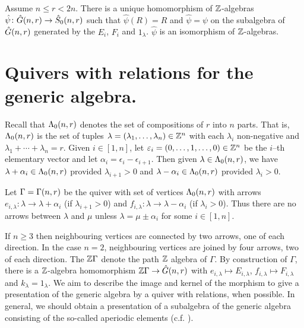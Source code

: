 \documentclass[a4paper, 11pt]{report}
\begin{document}
\begin{theorem}
Assume $n\le r< 2n$. There is a unique homomorphism of $\mathbb{Z}$-algebras $\hat{\psi}\colon\hat{G}(n,r)\to\hat{S}_0(n,r)$ such that $\hat{\psi}(R)=R$ and $\hat{\psi}=\psi$ on the subalgebra of $\hat{G}(n,r)$ generated by the $E_i$, $F_i$ and $1_\lambda$. $\hat{\psi}$ is an isomorphism of $\mathbb{Z}$-algebras.
\end{theorem}

\section{Quivers with relations for the generic algebra.}

Recall that $\Lambda_0(n,r)$ denotes the set of compositions of $r$ into $n$ parts. That is, $\Lambda_0(n,r)$ is the set of tuples $\lambda = (\lambda_1,\ldots,\lambda_n)\in\mathbb{Z}^n$ with each $\lambda_i$ non-negative and $\lambda_1 +\cdots +\lambda_n = r$. Given $i\in [1,n]$, let $\varepsilon_i = (0,\ldots,1,\ldots,0)\in\mathbb{Z}^n$ be the $i$--th elementary vector and let $\alpha_i = \epsilon_i - \epsilon_{i+1}$. Then given $\lambda\in\Lambda_0(n,r)$, we have $\lambda + \alpha_i\in\Lambda_0(n,r)$ provided $\lambda_{i+1}>0$ and $\lambda - \alpha_i\in\Lambda_0(n,r)$ provided $\lambda_i>0$.

Let $\Gamma =\Gamma(n,r)$ be the quiver with set of vertices $\Lambda_0(n,r)$ with arrows $e_{i,\lambda}\colon\lambda\to\lambda +\alpha_i$ (if $\lambda_{i+1}>0$) and $f_{i,\lambda}\colon\lambda\to\lambda -\alpha_i$ (if $\lambda_i>0$). Thus there are no arrows between $\lambda$ and $\mu$ unless $\lambda = \mu\pm \alpha_i$ for some $i\in [1,n]$.

If $n\geq 3$ then neighbouring vertices are connected by two arrows, one of each direction. In the case $n=2$, neighbouring vertices are joined by four arrows, two of each direction. The $\mathbb{Z}\Gamma$ denote the path $\mathbb{Z}$ algebra of $\Gamma$. By construction of $\Gamma$, there is a $\mathbb{Z}$-algebra homomorphism $\mathbb{Z}\Gamma\to\hat{G}(n,r)$ with $e_{i,\lambda}\mapsto E_{i,\lambda}$, $f_{i,\lambda}\mapsto F_{i,\lambda}$ and $k_\lambda = 1_\lambda$. We aim to describe the image and kernel of the morphism to give a presentation of the generic algebra by a quiver with relations, when possible. In general, we should obtain a presentation of a subalgebra of the generic algebra consisting of the so-called aperiodic elements (c.f. \cite{lusztig99}).

\end{document}
